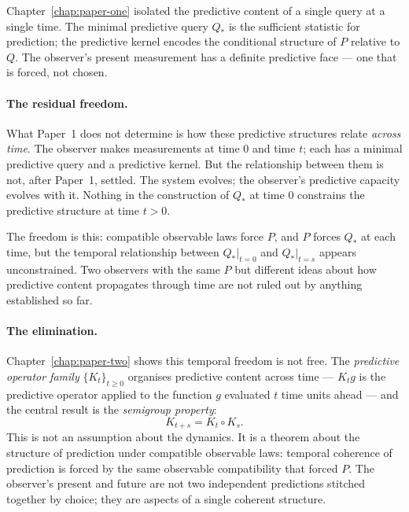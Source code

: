 
Chapter~\ref{chap:paper-one} isolated the predictive content of a single
query at a single time.  The minimal predictive query $Q_*$ is the
sufficient statistic for prediction; the predictive kernel encodes the
conditional structure of $P$ relative to $Q$.  The observer's present
measurement has a definite predictive face --- one that is forced, not
chosen.

\medskip

\paragraph{The residual freedom.}
What Paper~1 does not determine is how these predictive structures relate
\emph{across time}.  The observer makes measurements at time $0$ and
time $t$; each has a minimal predictive query and a predictive kernel.
But the relationship between them is not, after Paper~1, settled.  The
system evolves; the observer's predictive capacity evolves with it.
Nothing in the construction of $Q_*$ at time $0$ constrains the
predictive structure at time $t > 0$.

The freedom is this: compatible observable laws force $P$, and $P$
forces $Q_*$ at each time, but the temporal relationship between
$Q_*|_{t=0}$ and $Q_*|_{t=s}$ appears unconstrained.  Two observers
with the same $P$ but different ideas about how predictive content
propagates through time are not ruled out by anything established
so far.

\medskip

\paragraph{The elimination.}
Chapter~\ref{chap:paper-two} shows this temporal freedom is not free.
The \emph{predictive operator family} $\{K_t\}_{t \geq 0}$ organises
predictive content across time --- $K_t g$ is the predictive operator
applied to the function $g$ evaluated $t$ time units ahead --- and
the central result is the \emph{semigroup property}:
\[
  K_{t+s} = K_t \circ K_s.
\]
This is not an assumption about the dynamics.  It is a theorem about
the structure of prediction under compatible observable laws: temporal
coherence of prediction is forced by the same observable compatibility
that forced $P$.  The observer's present and future are not two
independent predictions stitched together by choice; they are aspects
of a single coherent structure.

